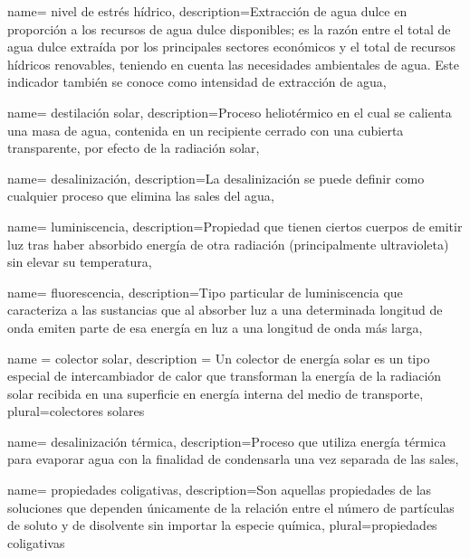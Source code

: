 {
	name= {nivel de estrés hídrico},
	description={Extracción de agua dulce en proporción a los recursos de agua dulce disponibles; es la razón entre el total de agua dulce extraída por los principales sectores económicos y el total de recursos hídricos renovables, teniendo en cuenta las necesidades ambientales de agua. Este indicador también se conoce como intensidad de extracción de agua},
}

{
	name= {destilación solar},
	description={Proceso heliotérmico en el cual se calienta una masa de agua, contenida en un recipiente cerrado con una cubierta transparente, por efecto de la radiación solar},
}

{
	name= {desalinización},
	description={La desalinización se puede definir como cualquier proceso que elimina las sales del agua},
}

{
	name= {luminiscencia},
	description={Propiedad que tienen ciertos cuerpos de emitir luz tras haber absorbido energía de otra radiación (principalmente ultravioleta) sin elevar su temperatura},
}

{
	name= {fluorescencia},
	description={Tipo particular de \gls{luminiscencia} que caracteriza a las sustancias que al absorber luz a una determinada longitud de onda emiten parte de esa energía en luz a una longitud de onda más larga},
}

{
	name = {colector solar},
	description = {Un colector de energía solar es un tipo especial de intercambiador de calor que transforman la energía de la radiación solar recibida en una superficie en energía interna del medio de transporte},
	plural={colectores solares}
}

{
	name= {desalinización térmica},
	description={Proceso que utiliza energía térmica para evaporar agua con la finalidad de condensarla una vez separada de las sales},
}

{
	name= {propiedades coligativas},
	description={Son aquellas propiedades de las soluciones que dependen únicamente de la relación entre el número de partículas de soluto y de disolvente sin importar la especie química},
	plural={propiedades coligativas}
}